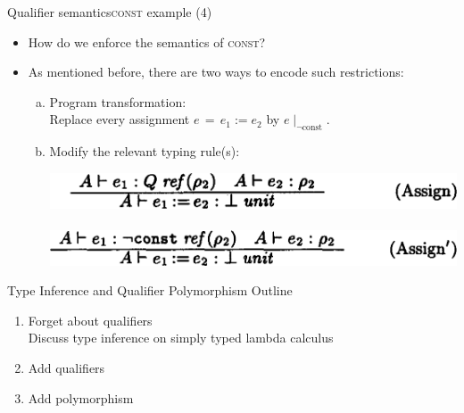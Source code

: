 \documentclass{beamer}
\begin{document}
\begin{frame}{Qualifier semantics}{\textsc{const} example (4)}
  \begin{itemize}
  \item How do we enforce the semantics of \textsc{const}?
  \item<2-> As mentioned before, there are two ways to encode such restrictions:
    \begin{enumerate}[a)]
    \item<2-> Program transformation:\\ Replace every assignment $e\,=\,e_1\!:=\!e_2$ by $e\!\mid_{\neg\text{const}}$.
    \item<3-> Modify the relevant typing rule(s):\\
      \begin{center}
      \includegraphics[scale=0.25]{paper_assign_original.png}\\
      \vspace{0.5em}{\Huge $\Downarrow$}\hspace{5.8em}\vspace{0.5em}\\
      \includegraphics[scale=0.25]{paper_assign_adapted.png}
      \end{center}
    \end{enumerate}
  \end{itemize}
\end{frame}



\begin{frame}{Type Inference and Qualifier Polymorphism}
Outline
\begin{enumerate}
\item Forget about qualifiers\\
Discuss type inference on simply typed lambda calculus
\item Add qualifiers
\item Add polymorphism
\end{enumerate}
\end{frame}
\end{document}
